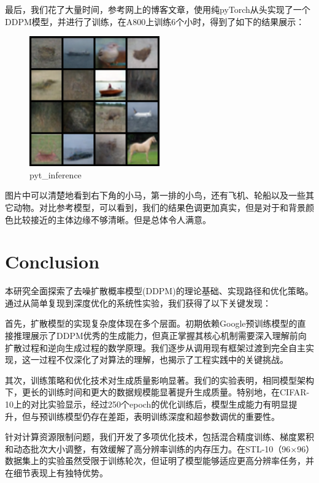\documentclass{ctexart}
\begin{document}
\noindent
最后，我们花了大量时间，参考网上的博客文章，使用纯pyTorch从头实现了一个DDPM模型，并进行了训练，在A800上训练6个小时，得到了如下的结果展示：
\begin{figure}[H]
     \centering
     \includegraphics[width=0.5\textwidth]{sample_pyt.png}
     \caption{pyt\_inference}
     \label{fig:pyt_inference}  %
\end{figure}

\noindent
图片中可以清楚地看到右下角的小马，第一排的小鸟，还有飞机、轮船以及一些其它动物。对比参考模型，可以看到，我们的结果色调更加真实，但是对于和背景颜色比较接近的主体边缘不够清晰。但是总体令人满意。

\section{Conclusion}
\noindent
本研究全面探索了去噪扩散概率模型(DDPM)的理论基础、实现路径和优化策略。通过从简单复现到深度优化的系统性实验，我们获得了以下关键发现：

\noindent
首先，扩散模型的实现复杂度体现在多个层面。初期依赖Google预训练模型的直接推理展示了DDPM优秀的生成能力，但真正掌握其核心机制需要深入理解前向扩散过程和逆向生成过程的数学原理。我们逐步从调用现有框架过渡到完全自主实现，这一过程不仅深化了对算法的理解，也揭示了工程实践中的关键挑战。

\noindent
其次，训练策略和优化技术对生成质量影响显著。我们的实验表明，相同模型架构下，更长的训练时间和更大的数据规模能显著提升生成质量。特别地，在CIFAR-10上的对比实验显示，经过250个epoch的优化训练后，模型生成能力有明显提升，但与预训练模型仍存在差距，表明训练深度和超参数调优的重要性。

\noindent
针对计算资源限制问题，我们开发了多项优化技术，包括混合精度训练、梯度累积和动态批次大小调整，有效缓解了高分辨率训练的内存压力。在STL-10（96×96）数据集上的实验虽然受限于训练轮次，但证明了模型能够适应更高分辨率任务，并在细节表现上有独特优势。
\end{document}
